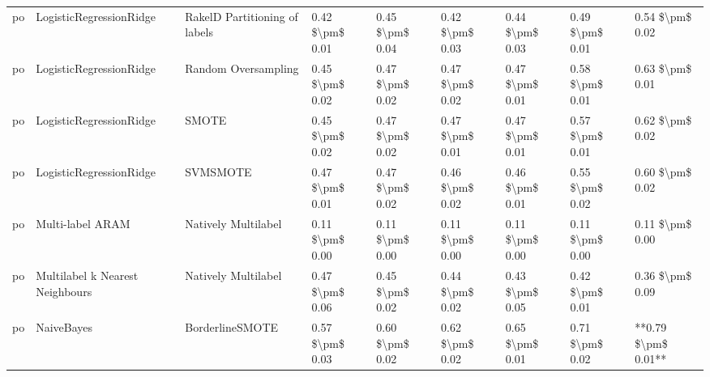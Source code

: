\begin{tabular}{lllllllll}
      po &         LogisticRegressionRidge & RakelD Partitioning of labels &     0.42 \$\textbackslash pm\$ 0.01 &           0.45 \$\textbackslash pm\$ 0.04 &       0.42 \$\textbackslash pm\$ 0.03 &        0.44 \$\textbackslash pm\$ 0.03 &                         0.49 \$\textbackslash pm\$ 0.01 &     0.54 \$\textbackslash pm\$ 0.02 \\
      po &         LogisticRegressionRidge &           Random Oversampling &     0.45 \$\textbackslash pm\$ 0.02 &           0.47 \$\textbackslash pm\$ 0.02 &       0.47 \$\textbackslash pm\$ 0.02 &        0.47 \$\textbackslash pm\$ 0.01 &                         0.58 \$\textbackslash pm\$ 0.01 &     0.63 \$\textbackslash pm\$ 0.01 \\
      po &         LogisticRegressionRidge &                         SMOTE &     0.45 \$\textbackslash pm\$ 0.02 &           0.47 \$\textbackslash pm\$ 0.02 &       0.47 \$\textbackslash pm\$ 0.01 &        0.47 \$\textbackslash pm\$ 0.01 &                         0.57 \$\textbackslash pm\$ 0.01 &     0.62 \$\textbackslash pm\$ 0.02 \\
      po &         LogisticRegressionRidge &                      SVMSMOTE &     0.47 \$\textbackslash pm\$ 0.01 &           0.47 \$\textbackslash pm\$ 0.02 &       0.46 \$\textbackslash pm\$ 0.02 &        0.46 \$\textbackslash pm\$ 0.01 &                         0.55 \$\textbackslash pm\$ 0.02 &     0.60 \$\textbackslash pm\$ 0.02 \\
      po &                Multi-label ARAM &           Natively Multilabel &     0.11 \$\textbackslash pm\$ 0.00 &           0.11 \$\textbackslash pm\$ 0.00 &       0.11 \$\textbackslash pm\$ 0.00 &        0.11 \$\textbackslash pm\$ 0.00 &                         0.11 \$\textbackslash pm\$ 0.00 &     0.11 \$\textbackslash pm\$ 0.00 \\
      po & Multilabel k Nearest Neighbours &           Natively Multilabel &     0.47 \$\textbackslash pm\$ 0.06 &           0.45 \$\textbackslash pm\$ 0.02 &       0.44 \$\textbackslash pm\$ 0.02 &        0.43 \$\textbackslash pm\$ 0.05 &                         0.42 \$\textbackslash pm\$ 0.01 &     0.36 \$\textbackslash pm\$ 0.09 \\
      po &                      NaiveBayes &               BorderlineSMOTE &     0.57 \$\textbackslash pm\$ 0.03 &           0.60 \$\textbackslash pm\$ 0.02 &       0.62 \$\textbackslash pm\$ 0.02 &        0.65 \$\textbackslash pm\$ 0.01 &                         0.71 \$\textbackslash pm\$ 0.02 & **0.79 \$\textbackslash pm\$ 0.01** \\

\end{tabular}
